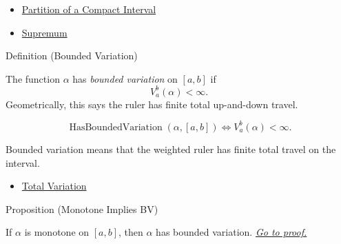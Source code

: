 \begin{dependencies}
\begin{itemize}
  \item \hyperref[def:integration-partition]{Partition of a Compact Interval}
  \item \hyperref[def:supremum]{Supremum}
\end{itemize}
\end{dependencies}

\begin{definitionbox}{Definition (Bounded Variation)}
\begin{definition}
\label{def:bounded-variation-integration}
The function \(\alpha\) has \emph{bounded variation} on \([a,b]\) if
\[
  V_a^b(\alpha)<\infty.
\]
Geometrically, this says the ruler has finite total up-and-down travel.
\end{definition}
\end{definitionbox}

\begin{remark*}
\[
\operatorname{HasBoundedVariation}(\alpha,[a,b])
\Longleftrightarrow
V_a^b(\alpha)<\infty.
\]
\end{remark*}

\begin{remark*}[Interpretation]
Bounded variation means that the weighted ruler has finite total travel on the
interval.
\end{remark*}

\begin{dependencies}
\begin{itemize}
  \item \hyperref[def:total-variation]{Total Variation}
\end{itemize}
\end{dependencies}

\begin{propositionbox}{Proposition (Monotone Implies BV)}
\begin{proposition}
\label{prop:monotone-bounded-variation}
If \(\alpha\) is monotone on \([a,b]\), then \(\alpha\) has bounded variation.
\hyperref[prf:monotone-bounded-variation]{\textit{Go to proof.}}
\end{proposition}
\end{propositionbox}

